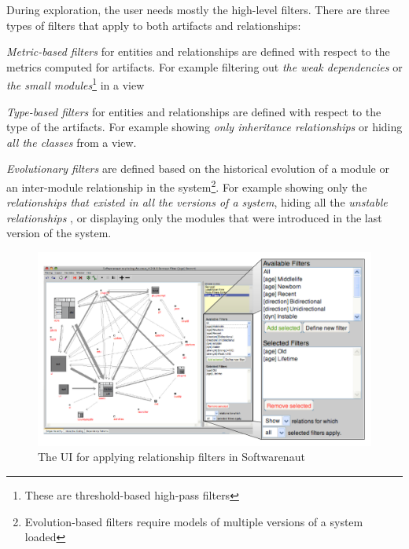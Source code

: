 \documentclass[preprint,12pt]{elsarticle}
\begin{document}
During exploration, the user needs mostly the high-level filters. There are three types of filters that apply to both artifacts and relationships: 

\begin{description}
\item {\em Metric-based filters} for entities and relationships are defined with respect to the metrics computed for artifacts. For example filtering out {\em the weak dependencies} or {\em the small modules}\footnote{These are threshold-based high-pass filters} in a view

\item {\em Type-based filters} for entities and relationships are defined with respect to the type of the artifacts. For example showing {\em only inheritance relationships} or hiding {\em all the classes} from a view.

\item {\em Evolutionary filters} are defined based on the historical evolution of a module or an inter-module relationship in the system\footnote{Evolution-based filters require models of multiple versions of a system loaded}. For example showing only the {\em relationships that existed in all the versions of a system}, hiding all the {\em unstable relationships} \cite{lungu-relevo}, or displaying only the modules that were introduced in the last version of the system.
\end{description}

\begin{figure}[ht]
\begin{center}
\includegraphics[width=\linewidth]{SnautFilteringPanel}
\caption{The UI for applying relationship filters in Softwarenaut}
\end{center}
\end{figure}
\end{document}
